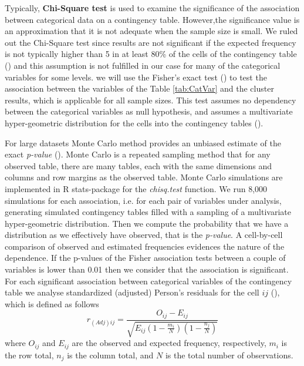 \documentclass{bmcart}
\begin{document}
Typically, \textbf{Chi-Square test} is used to examine the significance of the association between categorical data on a contingency table. However,the significance value is an approximation that it is not adequate when the sample size is small. We ruled out the Chi-Square test since results are not significant if the expected frequency is not typically higher than 5 in at least 80\% of the cells of the contingency table (\cite{ContingencyTable1984}) and this assumption is not fulfilled in our case for many of the categorical variables for some levels. we will use
the Fisher's exact test (\cite{ContingencyTableFisher1922}) to test the association between the variables of the Table \ref{tab:CatVar} and the cluster results, which is applicable for all sample sizes. This test assumes no dependency between the categorical variables as null hypothesis, and assumes a multivariate hyper-geometric distribution for the cells into the contingency tables (\cite{Mehta1983ANA}).

For large datasets Monte Carlo method provides an unbiased estimate of the exact  \textit{p-value} (\cite{mehta1996exact}). Monte Carlo is a repeated sampling method that for any observed table, there are many tables, each with the same dimensions and columns and row margins as the observed table. Monte Carlo simulations are  implemented in R stats-package for the \textit{chisq.test} function. We run 8,000 simulations for each association, i.e. for each pair of variables under analysis, generating simulated contingency tables filled with a sampling of a multivariate hyper-geometric distribution. Then we compute the probability that we have a distribution as we effectively have observed, that is the \textit{p-value}. A cell-by-cell comparison of observed and estimated frequencies evidences the nature of the dependence. If the  p-values of the Fisher association tests between a couple of variables is lower than 0.01  then we consider that the association is significant. For each significant association between categorical variables of the contingency table we analyse standardized (adjusted) Person's residuals for the cell $ij$ (\cite{Agresti2018introduction}), which is defined as follows
\begin{equation}
	r_{(Adj)ij}  =\frac{O_{ij}-E_{ij}}{\sqrt{E_{ij}(1-\frac{m_i}{N})(1-\frac{n_j}{N})}}
\end{equation}
where $O_{ij}$ and $E_{ij}$ are the observed and expected frequency, respectively, $m_i$ is the row total, $n_j$ is the column total, and $N$ is the total number of observations.
\end{document}
